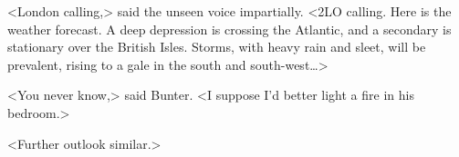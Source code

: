 <London calling,> said the unseen voice impartially. <2LO calling. Here is the weather forecast. A deep depression is crossing the Atlantic, and a secondary is stationary over the British Isles. Storms, with heavy rain and sleet, will be prevalent, rising to a gale in the south and south-west\dots>

<You never know,> said Bunter. <I suppose I'd better light a fire in his bedroom.>

<Further outlook similar.>
